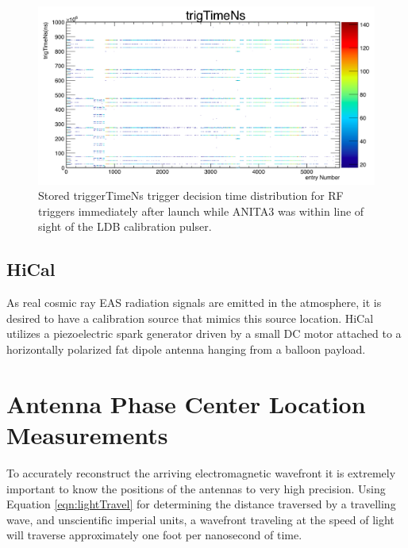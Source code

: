 	\begin{figure}
		\includegraphics[width=\textwidth]{figures/mcmTrigTimeNs}
		\caption{Stored triggerTimeNs trigger decision time distribution for RF triggers immediately after launch while ANITA3 was within line of sight of the LDB calibration pulser.}
		\label{fig:mcmTrigTimeNs}
	\end{figure}		

	
		
		
		
	\subsection{HiCal}
		As real cosmic ray EAS radiation signals are emitted in the atmosphere, it is desired to have a calibration source that mimics this source location.  HiCal utilizes a piezoelectric spark generator driven by a small DC motor attached to a horizontally polarized fat dipole antenna hanging from a balloon payload.


\section{Antenna Phase Center Location Measurements}
	To accurately reconstruct the arriving electromagnetic wavefront it is extremely important to know the positions of the antennas to very high precision.   Using Equation \ref{eqn:lightTravel} for determining the distance traversed by a travelling wave, and unscientific imperial units, a wavefront traveling at the speed of light will traverse approximately one foot per nanosecond of time. 
	

